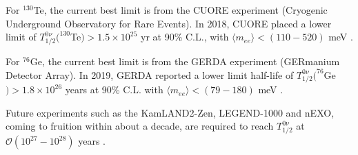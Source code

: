 For $^{130}$Te, the current best limit is from the CUORE experiment (Cryogenic Underground Observatory for Rare Events). In 2018, CUORE placed a lower limit of $T^{0\nu}_{1/2}(^{130}$Te$)>1.5\times 10^{25}$ yr at 90\% C.L., with $\langle m_{ee}\rangle<(110-520)$ meV \cite{alduino2018first}.

For $^{76}$Ge, the current best limit is from the GERDA experiment (GERmanium Detector Array). In 2019, GERDA reported a lower limit half-life of $T^{0\nu}_{1/2}(^{76}$Ge$)>1.8\times 10^{26}$ years at 90\% C.L. with $\langle m_{ee}\rangle<(79-180)$ meV \cite{agostini2020final}.

Future experiments such as the KamLAND2-Zen, LEGEND-1000 and nEXO, coming to fruition within about a decade, are required to reach $T^{0\nu}_{1/2}$ at $\mathcal{O}(10^{27}-10^{28})$ years \cite{dolinski2019neutrinoless}.
